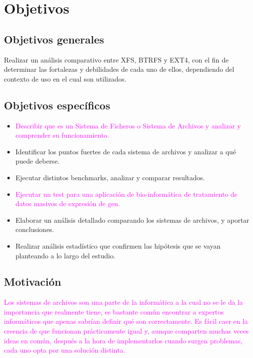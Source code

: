 \section{Objetivos}

\subsection{Objetivos generales}
Realizar un análisis comparativo entre  XFS, BTRFS y EXT4, con el fin de determinar las fortalezas y debilidades de cada uno de ellos, dependiendo del contexto de uso en el cual son utilizados.


\subsection{Objetivos específicos}
\begin{itemize}
    \item \textcolor{magenta}{ Describir que es un Sistema de Ficheros o Sistema de Archivos y analizar y comprender su funcionamiento.}
    \item Identificar los puntos fuertes de cada sistema de archivos y analizar a qué puede deberse.
    \item Ejecutar distintos benchmarks, analizar y comparar resultados.
    \item \textcolor{magenta}{Ejecutar un test para una aplicación de bio-informática de tratamiento de datos masivos de expresión de gen.}
    \item Elaborar un análisis detallado comparando los sistemas de archivos, y aportar conclusiones.
    \item Realizar análisis estadístico que confirmen las hipótesis que se vayan planteando a lo largo del estudio.
\end{itemize}

\subsection{Motivación}
\textcolor{magenta}{Los sistemas de archivos son una parte de la informática a la cual no se le da la importancia que realmente tiene, es bastante común encontrar a expertos informáticos que apenas sabrían definir qué son correctamente. Es fácil caer en la creencia de que funcionan prácticamente igual y, aunque comparten muchas veces ideas en común, después a la hora de implementarlos cuando surgen problemas, cada uno opta por una solución distinta.\\}

